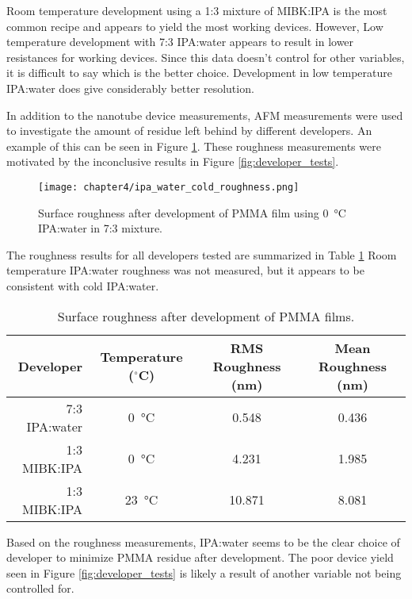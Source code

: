 Room temperature development using a 1:3 mixture of MIBK:IPA is the most common recipe and appears to yield the most working devices. However, Low temperature development with 7:3 IPA:water appears to result in lower resistances for working devices. Since this data doesn't control for other variables, it is difficult to say which is the better choice. Development in low temperature IPA:water does give considerably better resolution. 

In addition to the nanotube device measurements, AFM measurements were used to investigate the amount of residue left behind by different developers. An example of this can be seen in Figure \ref{fig:roughness}. These roughness measurements were motivated by the inconclusive results in Figure \ref{fig:developer_tests}.

\begin{figure}
    \centering
    \texttt{[image: chapter4/ipa\_water\_cold\_roughness.png]}
    \caption{Surface roughness after development of PMMA film using \SI{0}{\celsius} IPA:water in 7:3 mixture.}
    \label{fig:roughness}
\end{figure}

The roughness results for all developers tested are summarized in Table \ref{table:surface_roughness} Room temperature IPA:water roughness was not measured, but it appears to be consistent with cold IPA:water. 

\begin{table}
    \centering
    \caption{Surface roughness after development of PMMA films.}
    \begin{tabular}{ r | c c c}
        Developer & Temperature ($^{\circ}$C) & RMS Roughness (nm) & Mean Roughness (nm) \\ \hline
    7:3 IPA:water & \SI{0}{\celsius} & 0.548 & 0.436 \\
    1:3 MIBK:IPA & \SI{0}{\celsius} & 4.231 & 1.985 \\
    1:3 MIBK:IPA & \SI{23}{\celsius} & 10.871 & 8.081 \\
    \end{tabular}
    \label{table:surface_roughness}  
\end{table}

Based on the roughness measurements, IPA:water seems to be the clear choice of developer to minimize PMMA residue after development. The poor device yield seen in Figure \ref{fig:developer_tests} is likely a result of another variable not being controlled for.

